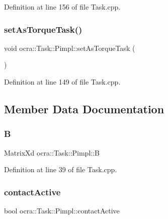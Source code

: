 Definition at line 156 of file Task.\+cpp.

\hypertarget{structocra_1_1Task_1_1Pimpl_ab5bfb5126aa62de5e77c49c65711f0c2}{}\label{structocra_1_1Task_1_1Pimpl_ab5bfb5126aa62de5e77c49c65711f0c2} 
\subsubsection{\texorpdfstring{set\+As\+Torque\+Task()}{setAsTorqueTask()}}
{\footnotesize\ttfamily void ocra\+::\+Task\+::\+Pimpl\+::set\+As\+Torque\+Task (\begin{DoxyParamCaption}{ }\end{DoxyParamCaption})\hspace{0.3cm}{\ttfamily [inline]}}



Definition at line 149 of file Task.\+cpp.



\subsection{Member Data Documentation}
\hypertarget{structocra_1_1Task_1_1Pimpl_a87e4a6245b3319bbd17d10655d164c92}{}\label{structocra_1_1Task_1_1Pimpl_a87e4a6245b3319bbd17d10655d164c92} 
\subsubsection{\texorpdfstring{B}{B}}
{\footnotesize\ttfamily Matrix\+Xd ocra\+::\+Task\+::\+Pimpl\+::B}



Definition at line 39 of file Task.\+cpp.

\hypertarget{structocra_1_1Task_1_1Pimpl_acf9fa37d987169c93362d793335e1cac}{}\label{structocra_1_1Task_1_1Pimpl_acf9fa37d987169c93362d793335e1cac} 
\subsubsection{\texorpdfstring{contact\+Active}{contactActive}}
{\footnotesize\ttfamily bool ocra\+::\+Task\+::\+Pimpl\+::contact\+Active}




